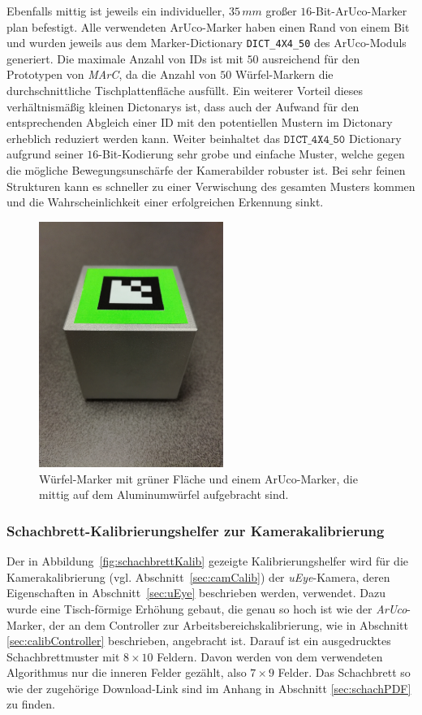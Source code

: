 Ebenfalls mittig ist jeweils ein individueller, $35\,mm$ großer $16$-Bit-ArUco-Marker plan befestigt. Alle verwendeten ArUco-Marker haben einen Rand von einem Bit und wurden jeweils aus dem Marker-Dictionary \texttt{DICT\_4X4\_50} des ArUco-Moduls~\cite{website:ArucoDoc} generiert. Die maximale Anzahl von IDs ist mit $50$ ausreichend für den Prototypen von \textit{MArC}, da die Anzahl von $50$ Würfel-Markern die durchschnittliche Tischplattenfläche ausfüllt.
Ein weiterer Vorteil dieses verhältnismäßig kleinen Dictonarys ist, dass auch der Aufwand für den entsprechenden Abgleich einer ID mit den potentiellen Mustern im Dictonary erheblich reduziert werden kann. 
Weiter beinhaltet das $\texttt{DICT\_4X4\_50}$ Dictionary aufgrund seiner $16$-Bit-Kodierung sehr grobe und einfache Muster, welche gegen die mögliche Bewegungsunschärfe der Kamerabilder robuster ist. Bei sehr feinen Strukturen kann es schneller zu einer Verwischung des gesamten Musters kommen und die Wahrscheinlichkeit einer erfolgreichen Erkennung sinkt.

\begin{figure}[H] 
	\center 
	\includegraphics[trim = 0mm 280mm 0mm 150mm, clip, width=6cm]{Bilder/tracking-marker.jpg}			
	\caption[Würfel-Marker]{Würfel-Marker mit grüner Fläche und einem ArUco-Marker, die mittig auf dem Aluminumwürfel aufgebracht sind.}
	\label{fig:marker}
\end{figure}

\subsubsection{Schachbrett-Kalibrierungshelfer zur Kamerakalibrierung}\label{sec:SchachbrettKalib} 
Der in Abbildung~\ref{fig:schachbrettKalib} gezeigte Kalibrierungshelfer wird für die Kamerakalibrierung (vgl. Abschnitt~\ref{sec:camCalib}) der \textit{uEye}-Kamera, deren Eigenschaften in Abschnitt~\ref{sec:uEye} beschrieben werden, verwendet. Dazu wurde eine Tisch-förmige Erhöhung gebaut, die genau so hoch ist wie der \textit{ArUco}-Marker, der an dem Controller zur Arbeitsbereichskalibrierung, wie in Abschnitt \ref{sec:calibController} beschrieben, angebracht ist. Darauf ist ein ausgedrucktes Schachbrettmuster mit $8\times10$ Feldern. Davon werden von dem verwendeten Algorithmus nur die inneren Felder gezählt, also $7\times9$ Felder. Das Schachbrett so wie der zugehörige Download-Link sind im Anhang in Abschnitt \ref{sec:schachPDF} zu finden. 

